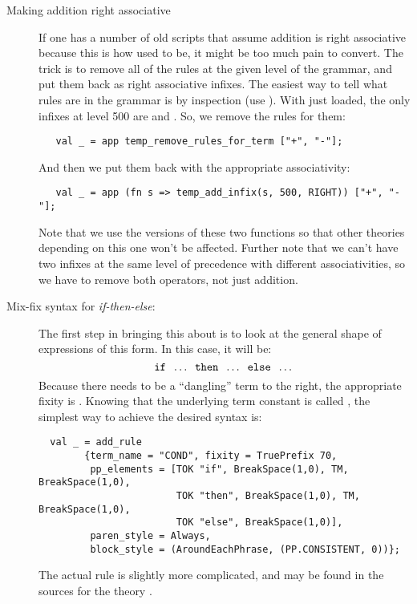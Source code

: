 {\begin{description}
\item[Making addition right associative] If one has a number of old
  scripts that assume addition is right associative because this is
  how \HOL{} used to be, it might be too much pain to convert.  The trick
  is to remove all of the rules at the given level of the grammar, and
  put them back as right associative infixes.  The easiest way to tell
  what rules are in the grammar is by inspection (use
  ).  With just 
  loaded, the only infixes at level 500 are \holtxt{+} and
  \holtxt{-}.  So, we remove the rules for them:
\begin{hol}
\begin{verbatim}
   val _ = app temp_remove_rules_for_term ["+", "-"];
\end{verbatim}
\end{hol}
  \noindent And then we put them back with the appropriate
  associativity:
\begin{hol}
\begin{verbatim}
   val _ = app (fn s => temp_add_infix(s, 500, RIGHT)) ["+", "-"];
\end{verbatim}
\end{hol}
\noindent Note that we use the  versions of these two
functions so that other theories depending on this one won't be
affected.  Further note that we can't have two infixes at the same
level of precedence with different associativities, so we have to
remove both operators, not just addition.

\item[Mix-fix syntax for {\it if-then-else}:]
%
The first step in bringing this about is to look at the general shape
of expressions of this form.  In this case, it will be:
%
\[
  \holtxt{if}\;\; \dots \;\;\holtxt{then}\;\;\dots\;\;
  \holtxt{else}\;\;\dots
  \]
%
 Because there needs to be a ``dangling'' term to the right, the
  appropriate fixity is .  Knowing that the underlying
  term constant is called , the simplest way to achieve
  the desired syntax is:
\begin{hol}
\begin{verbatim}
  val _ = add_rule
        {term_name = "COND", fixity = TruePrefix 70,
         pp_elements = [TOK "if", BreakSpace(1,0), TM, BreakSpace(1,0),
                        TOK "then", BreakSpace(1,0), TM, BreakSpace(1,0),
                        TOK "else", BreakSpace(1,0)],
         paren_style = Always,
         block_style = (AroundEachPhrase, (PP.CONSISTENT, 0))};
\end{verbatim}
\end{hol}
\noindent The actual rule is slightly more complicated, and
may be found in the sources for the theory .


\end{description}}
